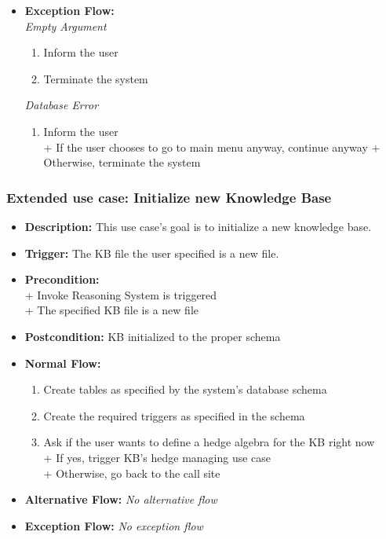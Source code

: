 \documentclass[../gr-final.tex]{subfiles}
\begin{document}
\begin{itemize}
  \item {\bfseries Exception Flow:}\\
    {\em Empty Argument}
    \begin{enumerate}
      \item Inform the user
      \item Terminate the system
    \end{enumerate}

    {\em Database Error}
    \begin{enumerate}
      \item Inform the user\\
        \indent + If the user chooses to go to main menu anyway,
          continue anyway
        \indent + Otherwise, terminate the system      
    \end{enumerate}

\end{itemize}

\subsubsection{Extended use case: Initialize new Knowledge Base}
\begin{itemize}
  \item {\bfseries Description:} This use case's goal is to
    initialize a new knowledge base.
  \item {\bfseries Trigger:} The KB file the user specified is a
    new file.
  \item {\bfseries Precondition:} \\
    \indent + Invoke Reasoning System is triggered\\
    \indent + The specified KB file is a new file
  \item {\bfseries Postcondition:} KB initialized to the proper
    schema    
  \item {\bfseries Normal Flow:}
    \begin{enumerate}
      \item Create tables as specified by the system's database
        schema
      \item Create the required triggers as specified in the
        schema
      \item Ask if the user wants to define a hedge algebra for
        the KB right now\\
        \indent + If yes, trigger KB's hedge managing use case\\
        \indent + Otherwise, go back to the call site
    \end{enumerate}
  \item {\bfseries Alternative Flow:} {\em No alternative flow}
  \item {\bfseries Exception Flow:} {\em No exception flow}
\end{itemize}
\end{document}
